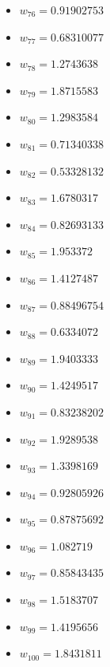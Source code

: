 \documentclass[11pt]{article}
\begin{document}
\begin{itemize}
\item $w_{76} = 0.91902753$
\item $w_{77} = 0.68310077$
\item $w_{78} = 1.2743638$
\item $w_{79} = 1.8715583$
\item $w_{80} = 1.2983584$
\item $w_{81} = 0.71340338$
\item $w_{82} = 0.53328132$
\item $w_{83} = 1.6780317$
\item $w_{84} = 0.82693133$
\item $w_{85} = 1.953372$
\item $w_{86} = 1.4127487$
\item $w_{87} = 0.88496754$
\item $w_{88} = 0.6334072$
\item $w_{89} = 1.9403333$
\item $w_{90} = 1.4249517$
\item $w_{91} = 0.83238202$
\item $w_{92} = 1.9289538$
\item $w_{93} = 1.3398169$
\item $w_{94} = 0.92805926$
\item $w_{95} = 0.87875692$
\item $w_{96} = 1.082719$
\item $w_{97} = 0.85843435$
\item $w_{98} = 1.5183707$
\item $w_{99} = 1.4195656$
\item $w_{100} = 1.8431811$
\end{itemize}
\end{document}

